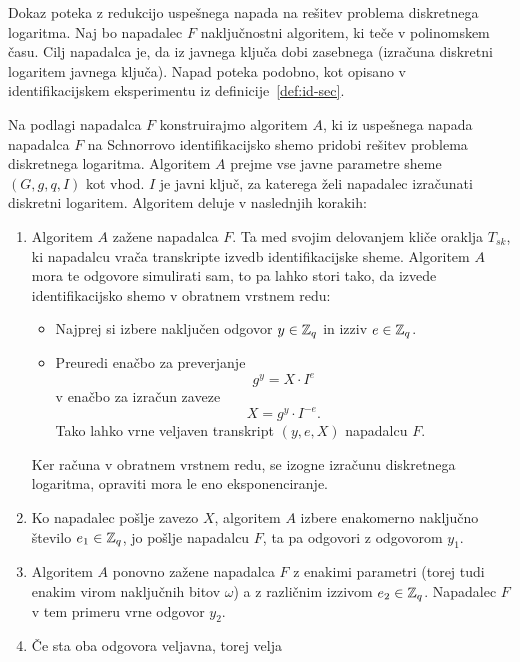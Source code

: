\begin{dokaz}
    Dokaz poteka z redukcijo uspešnega napada na rešitev problema diskretnega logaritma. Naj bo napadalec
    $F$ naključnostni algoritem, ki teče v polinomskem času. Cilj napadalca je, da iz javnega ključa
    dobi zasebnega (izračuna diskretni logaritem javnega ključa). Napad poteka podobno, kot opisano v
    identifikacijskem eksperimentu iz definicije~\ref{def:id-sec}.

    Na podlagi napadalca $F$ konstruirajmo algoritem $A$, ki iz uspešnega napada napadalca $F$ na
    Schnorrovo identifikacijsko shemo pridobi rešitev problema diskretnega logaritma. Algoritem $A$
    prejme vse javne parametre sheme $(G, g, q, I)$ kot vhod. $I$ je javni ključ, za katerega želi
    napadalec izračunati diskretni logaritem. Algoritem deluje v naslednjih korakih:
    \begin{enumerate}
        \item Algoritem $A$ zažene napadalca $F$. Ta med svojim delovanjem kliče oraklja $T_{sk}$,
            ki napadalcu vrača transkripte izvedb identifikacijske sheme. Algoritem $A$ mora te
            odgovore simulirati sam, to pa lahko stori tako, da izvede identifikacijsko shemo v
            obratnem vrstnem redu:
            \begin{itemize}
                \item Najprej si izbere naključen odgovor $y \in \mathbb Z_q$ in izziv $e \in \mathbb Z_q$.
                \item Preuredi enačbo za preverjanje
                    $$
                    g^y = X \cdot I^e
                    $$
                    v enačbo za izračun zaveze
                    $$
                    X = g^y \cdot I^{-e}.
                    $$
                    Tako lahko vrne veljaven transkript $(y, e, X)$ napadalcu $F$.
            \end{itemize}
            Ker računa v obratnem vrstnem redu, se izogne izračunu diskretnega logaritma, opraviti
            mora le eno eksponenciranje.
        \item Ko napadalec pošlje zavezo $X$, algoritem $A$ izbere enakomerno naključno število $e_1
            \in \mathbb Z_q$, jo pošlje napadalcu $F$, ta pa odgovori z odgovorom $y_1$.
        \item Algoritem $A$ ponovno zažene napadalca $F$ z enakimi parametri (torej tudi enakim
            virom naključnih bitov $\omega$) a z različnim izzivom $e_2 \in \mathbb Z_q$. Napadalec
            $F$ v tem primeru vrne odgovor $y_2$.
        \item Če sta oba odgovora veljavna, torej velja

\end{enumerate}
\end{dokaz}
